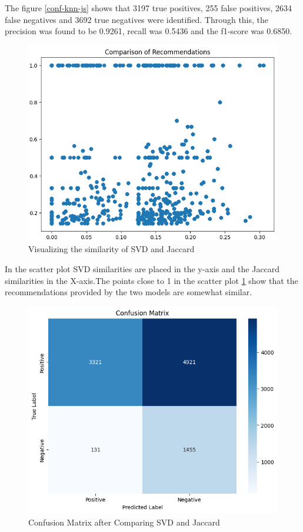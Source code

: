     \newpage

The figure \ref{conf-knn-js} shows that 3197 true positives, 255 false positives, 2634 false negatives and 3692 true negatives were identified. Through this, the precision was found to be 0.9261, recall was 0.5436 and the f1-score was 0.6850.

\begin{figure}[h]
        \centering
        \includegraphics[width=1\linewidth]{img/Graphics/sim-js-svd.png}
        \caption{Visualizing the similarity of SVD and Jaccard}
        \label{sim-js-svd}
    \end{figure}

    \newpage
    
In the scatter plot SVD similarities are placed in the y-axis and the Jaccard similarities in the X-axis.The points close to 1 in the scatter plot \ref{sim-js-svd} show that the recommendations provided by the two models are somewhat similar.

\begin{figure}[h]
        \centering
        \includegraphics[width=1\linewidth]{img/Graphics/conf-js-svd.png}
        \caption{Confusion Matrix after Comparing SVD and Jaccard}
        \label{conf-js-svd}
    \end{figure}

